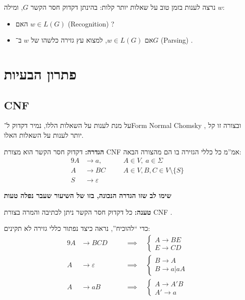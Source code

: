 \documentclass[]{article}
\newcommand\del   {$ \!\! $}
\newcommand\Si    {\Sigma}
\newcommand\vepsi {\varepsilon}
\begin{document}
	נרצה לענות בזמן טוב על שאלות יותר קלות: בהינתן דקדוק חסר הקשר $G$, ומילה $w$: 
	\begin{itemize}
		\item האם $w \in L(G)$ (Recognition) \del? 
		\item אם $w \in L(G)$, למצוא עץ גזירה כלשהו של $w$ ב־$G$ (Parsing) \del. 
	\end{itemize}
	
	\pagebreak
	\section{פתרון הבעיות}
	\subsection{CNF}
	על מנת לענות על השאלות הללו, נמיר דקדוק ל־Form Normal Chomsky \del, ובצורה זו קל יותר לענות על השאלות האלו. 
	
	\textbf{הגדרה: }דקדוק חסר הקשר הוא מצורת CNF אמ''מ כל כללי הגזירה בו הם מהצורה הבאה: 
	\begin{alignat}{9}
		A &\to a, &&\quad A \in V, \ a \in \Si \\
		A &\to BC &&\quad A \in V, B, C \in V \setminus \{S\} \\
		S &\to \vepsi
	\end{alignat}
	
	\textbf{שימו לב שזו הגדרה הנכונה, בזו של השיעור שעבר נפלה טעות}
	
	\textbf{טענה: }כל דקדוק חסר הקשר ניתן לכתיבה והמרה בצורת CNF \del. 
	
	כדי ``להוכיח'', נראה כיצד נפתור כללי גזירה לא תקינים: 
	\begin{alignat}{9}
		A&\to BCD &&\quad \implies \quad \begin{cases}
			A \to BE \\
			E \to CD
		\end{cases} \\
		A &\to \vepsi &&\quad \implies \quad \begin{cases}
			B \to A \\
			B \to a | aA
		\end{cases} \\
		A &\to aB &&\quad \implies \quad \begin{cases}
			A \to A'B \\
			A' \to a
		\end{cases}
	\end{alignat}
	
\end{document}
